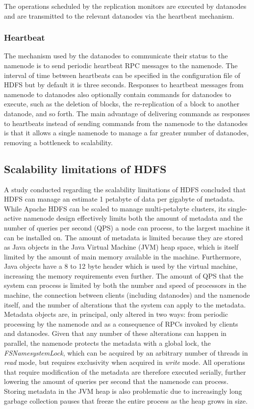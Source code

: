 The operations scheduled by the replication monitors are executed by datanodes and are transmitted to the relevant datanodes via the heartbeat mechanism.

\subsubsection{Heartbeat}
\label{sec:heartbeat}
The mechanism used by the datanodes to communicate their status to the namenode is to send periodic heartbeat RPC messages to the namenode.
The interval of time between heartbeats can be specified in the configuration file of HDFS but by default it is three seconds.
Responses to heartbeat messages from namenode to datanodes also optionally contain commands for datanodes to execute, such as the deletion of blocks, the re-replication of a block to another datanode, and so forth.
The main advantage of delivering commands as responses to heartbeats instead of sending commands from the namenode to the datanodes is that it allows a single namenode to manage a far greater number of datanodes, removing a bottleneck to scalability.

\subsection{Scalability limitations of HDFS}
\label{sec:scalability-limitations}
A study conducted regarding the scalability limitations of HDFS \cite{shvachko2010hdfs} concluded that HDFS can manage an estimate 1 petabyte of data per gigabyte of metadata.
While Apache HDFS can be scaled to manage multi-petabyte clusters, its single-active namenode design effectively limits both the amount of metadata and the number of queries per second (QPS) a node can process, to the largest machine it can be installed on.
The amount of metadata is limited because they are stored as Java objects in the Java Virtual Machine (JVM) heap space, which is itself limited by the amount of main memory available in the machine.
Furthermore, Java objects have a 8 to 12 byte header which is used by the virtual machine, increasing the memory requirements even further.
The amount of QPS that the system can process is limited by both the number and speed of processors in the machine, the connection between clients (including datanodes) and the namenode itself, and the number of alterations that the system can apply to the metadata.
Metadata objects are, in principal, only altered in two ways: from periodic processing by the namenode and as a consequence of RPCs invoked by clients and datanodes.
Given that any number of these alterations can happen in parallel, the namenode protects the metadata with a global lock, the \textit{FSNamesystemLock}, which can be acquired by an arbitrary number of threads in \emph{read} mode, but requires exclusivity when acquired in \emph{write} mode.
All operations that require modification of the metadata are therefore executed serially, further lowering the amount of queries per second that the namenode can process.
Storing metadata in the JVM heap is also problematic due to increasingly long garbage collection pauses that freeze the entire process as the heap grows in size.

\clearpage